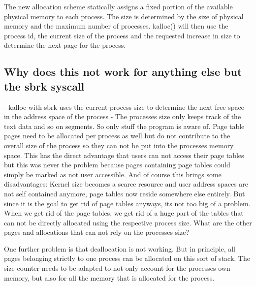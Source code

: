 The new allocation scheme statically assigns a fixed portion of the available physical memory
to each process. The size is determined by the size of physical memory and the maximum number
of processes.
kalloc() will then use the process id, the current size of the process and the requested
increase in size to determine the next page for the process.

\subsection*{Why does this not work for anything else but the sbrk syscall}
- kalloc with sbrk uses the current process size to determine the next free space in
the address space of the process
- The processes size only keeps track of the text data and so on segments. So only stuff
the program is aware of. Page table pages need to be allocated per process as well but
do not contribute to the overall size of the process so they can not be put into the
processes memory space. This has the direct advantage that users can not access their page tables
but this was never the problem because pages containing page tables could simply be marked
as not user accessible. And of course this brings some disadvantages: Kernel size becomes
a scarce resource and user address spaces are not self contained anymore, page tables now reside
somewhere else entirely.
But since it is the goal to get rid of page tables anyways, its not too big of a problem.
When we get rid of the page tables, we get rid of a huge part of the tables that can not
be directly allocated using the respective process size.
What are the other pages and allocations that can not rely on the processes size?

One further problem is that deallocation is not working. But in principle, all pages belonging
strictly to one process can be allocated on this sort of stack. The size counter
needs to be adapted to not only account for the processes own memory, but also
for all the memory that is allocated for the process.


